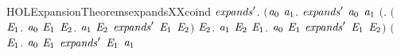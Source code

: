 \newcommand{\HOLExpansionTheoremsexpandsXXcasesYY}{\UseVerbatim{HOLExpansionTheoremsexpandsXXcasesYY}}
\begin{SaveVerbatim}{HOLExpansionTheoremsexpandsXXcoind}
\HOLTokenTurnstile{} \HOLSymConst{\HOLTokenForall{}}\ensuremath{\HOLBoundVar{expands}\sp{\prime}}.
       \ensuremath{(}\HOLSymConst{\HOLTokenForall{}}\ensuremath{\HOLBoundVar{a}\sb{\mathrm{0}}} \ensuremath{\HOLBoundVar{a}\sb{\mathrm{1}}}.
            \ensuremath{\HOLBoundVar{expands}\sp{\prime}} \ensuremath{\HOLBoundVar{a}\sb{\mathrm{0}}} \ensuremath{\HOLBoundVar{a}\sb{\mathrm{1}}} \HOLSymConst{\HOLTokenImp{}}
            \ensuremath{(}\HOLSymConst{\HOLTokenForall{}}.
                 \ensuremath{(}\HOLSymConst{\HOLTokenForall{}}\ensuremath{\HOLBoundVar{E}\sb{\mathrm{1}}}.
                      \ensuremath{\HOLBoundVar{a}\sb{\mathrm{0}}} \HOLTokenTransBegin{} \HOLTokenTransEnd \ensuremath{\HOLBoundVar{E}\sb{\mathrm{1}}} \HOLSymConst{\HOLTokenImp{}}
                      \HOLSymConst{\HOLTokenExists{}}\ensuremath{\HOLBoundVar{E}\sb{\mathrm{2}}}. \ensuremath{\HOLBoundVar{a}\sb{\mathrm{1}}} \HOLTokenTransBegin{} \HOLTokenTransEnd \ensuremath{\HOLBoundVar{E}\sb{\mathrm{2}}} \HOLSymConst{\HOLTokenConj{}} \ensuremath{\HOLBoundVar{expands}\sp{\prime}} \ensuremath{\HOLBoundVar{E}\sb{\mathrm{1}}} \ensuremath{\HOLBoundVar{E}\sb{\mathrm{2}}}\ensuremath{)} \HOLSymConst{\HOLTokenConj{}}
                 \HOLSymConst{\HOLTokenForall{}}\ensuremath{\HOLBoundVar{E}\sb{\mathrm{2}}}.
                     \ensuremath{\HOLBoundVar{a}\sb{\mathrm{1}}} \HOLTokenTransBegin{} \HOLTokenTransEnd \ensuremath{\HOLBoundVar{E}\sb{\mathrm{2}}} \HOLSymConst{\HOLTokenImp{}}
                     \HOLSymConst{\HOLTokenExists{}}\ensuremath{\HOLBoundVar{E}\sb{\mathrm{1}}}. \ensuremath{\HOLBoundVar{a}\sb{\mathrm{0}}} \HOLTokenWeakTransBegin{} \HOLTokenWeakTransEnd \ensuremath{\HOLBoundVar{E}\sb{\mathrm{1}}} \HOLSymConst{\HOLTokenConj{}} \ensuremath{\HOLBoundVar{expands}\sp{\prime}} \ensuremath{\HOLBoundVar{E}\sb{\mathrm{1}}} \ensuremath{\HOLBoundVar{E}\sb{\mathrm{2}}}\ensuremath{)} \HOLSymConst{\HOLTokenConj{}}
            \ensuremath{(}\HOLSymConst{\HOLTokenForall{}}\ensuremath{\HOLBoundVar{E}\sb{\mathrm{1}}}.
                 \ensuremath{\HOLBoundVar{a}\sb{\mathrm{0}}} \HOLTokenTransBegin\HOLConst{\ensuremath{\tau}}\HOLTokenTransEnd \ensuremath{\HOLBoundVar{E}\sb{\mathrm{1}}} \HOLSymConst{\HOLTokenImp{}}
                 \ensuremath{\HOLBoundVar{expands}\sp{\prime}} \ensuremath{\HOLBoundVar{E}\sb{\mathrm{1}}} \ensuremath{\HOLBoundVar{a}\sb{\mathrm{1}}} \HOLSymConst{\HOLTokenDisj{}}

\end{SaveVerbatim}
